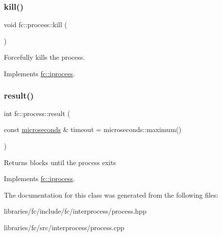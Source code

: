 \subsubsection{\texorpdfstring{kill()}{kill()}}
{\footnotesize\ttfamily void fc\+::process\+::kill (\begin{DoxyParamCaption}{ }\end{DoxyParamCaption})\hspace{0.3cm}{\ttfamily [virtual]}}

Forcefully kills the process. 

Implements \mbox{\hyperlink{classfc_1_1iprocess_ab8f2c418018f1722ae821334bfd6c0f8}{fc\+::iprocess}}.

\mbox{\label{classfc_1_1process_a58711b1b058e41f8139a971d3cc9b0a4}} 
\subsubsection{\texorpdfstring{result()}{result()}}
{\footnotesize\ttfamily int fc\+::process\+::result (\begin{DoxyParamCaption}\item[{const \mbox{\hyperlink{classfc_1_1microseconds}{microseconds}} \&}]{timeout = {\ttfamily microseconds\+:\+:maximum()} }\end{DoxyParamCaption})\hspace{0.3cm}{\ttfamily [virtual]}}

\begin{DoxyReturn}{Returns}
blocks until the process exits 
\end{DoxyReturn}


Implements \mbox{\hyperlink{classfc_1_1iprocess_abe1c8fb231fe682868561a1193361ce9}{fc\+::iprocess}}.



The documentation for this class was generated from the following files\+:\begin{DoxyCompactItemize}
\item 
libraries/fc/include/fc/interprocess/process.\+hpp\item 
libraries/fc/src/interprocess/process.\+cpp\end{DoxyCompactItemize}

